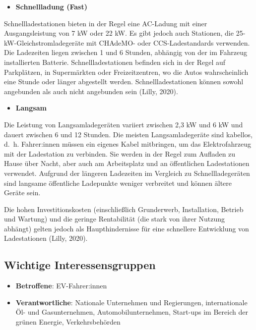 \documentclass[
]{book}
\providecommand{\tightlist}{%
  \setlength{\itemsep}{0pt}\setlength{\parskip}{0pt}}
\begin{document}
\begin{itemize}
\tightlist
\item
  \textbf{Schnellladung (Fast)}
\end{itemize}

Schnellladestationen bieten in der Regel eine AC-Ladung mit einer Ausgangsleistung von 7 kW oder 22 kW. Es gibt jedoch auch Stationen, die 25-kW-Gleichstromladegeräte mit CHAdeMO- oder CCS-Ladestandards verwenden. Die Ladezeiten liegen zwischen 1 und 6 Stunden, abhängig von der im Fahrzeug installierten Batterie. Schnellladestationen befinden sich in der Regel auf Parkplätzen, in Supermärkten oder Freizeitzentren, wo die Autos wahrscheinlich eine Stunde oder länger abgestellt werden. Schnellladestationen können sowohl angebunden als auch nicht angebunden sein (Lilly, 2020).

\begin{itemize}
\tightlist
\item
  \textbf{Langsam}
\end{itemize}

Die Leistung von Langsamladegeräten variiert zwischen 2,3 kW und 6 kW und dauert zwischen 6 und 12 Stunden. Die meisten Langsamladegeräte sind kabellos, d.~h. Fahrer:innen müssen ein eigenes Kabel mitbringen, um das Elektrofahrzeug mit der Ladestation zu verbinden. Sie werden in der Regel zum Aufladen zu Hause über Nacht, aber auch am Arbeitsplatz und an öffentlichen Ladestationen verwendet. Aufgrund der längeren Ladezeiten im Vergleich zu Schnellladegeräten sind langsame öffentliche Ladepunkte weniger verbreitet und können ältere Geräte sein.

Die hohen Investitionskosten (einschließlich Grunderwerb, Installation, Betrieb und Wartung) und die geringe Rentabilität (die stark von ihrer Nutzung abhängt) gelten jedoch als Haupthindernisse für eine schnellere Entwicklung von Ladestationen (Lilly, 2020).

\hypertarget{wichtige-interessensgruppen-8}{%
\subsection*{Wichtige Interessensgruppen}\label{wichtige-interessensgruppen-8}}

\begin{itemize}
\tightlist
\item
  \textbf{Betroffene}: EV-Fahrer:innen
\item
  \textbf{Verantwortliche}: Nationale Unternehmen und Regierungen, internationale Öl- und Gasunternehmen, Automobilunternehmen, Start-ups im Bereich der grünen Energie, Verkehrsbehörden
\end{itemize}
\end{document}
